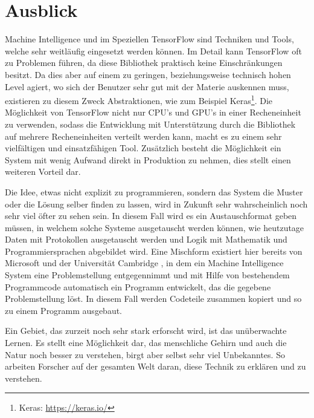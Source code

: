 \section{Ausblick}

\noindent
Machine Intelligence und im Speziellen TensorFlow sind Techniken und Tools, welche sehr weitläufig eingesetzt werden können. 
Im Detail kann TensorFlow oft zu Problemen führen, da diese Bibliothek praktisch keine Einschränkungen besitzt. 
Da dies aber auf einem zu geringen, beziehungsweise technisch hohen Level agiert, wo sich der Benutzer sehr gut mit der Materie auskennen muss, existieren zu diesem Zweck Abstraktionen, wie zum Beispiel Keras\footnote{Keras: \url{https://keras.io/}}. 
Die Möglichkeit von TensorFlow nicht nur CPU's und GPU's in einer Recheneinheit zu verwenden, sodass die Entwicklung mit Unterstützung durch die Bibliothek auf mehrere Recheneinheiten verteilt werden kann, macht es zu einem sehr vielfältigen und einsatzfähigen Tool. 
Zusätzlich besteht die Möglichkeit ein System mit wenig Aufwand direkt in Produktion zu nehmen, dies stellt einen weiteren Vorteil dar. \newline

\noindent
Die Idee, etwas nicht explizit zu programmieren, sondern das System die Muster oder die Lösung selber finden zu lassen, wird in Zukunft sehr wahrscheinlich noch sehr viel öfter zu sehen sein. 
In diesem Fall wird es ein Austauschformat geben müssen, in welchem solche Systeme ausgetauscht werden können, wie heutzutage Daten mit Protokollen ausgetauscht werden und Logik mit Mathematik und Programmiersprachen abgebildet wird. 
Eine Mischform existiert hier bereits von Microsoft und der Universität Cambridge \cite{deepcoder-learning-write-programs}, in dem ein Machine Intelligence System eine Problemstellung entgegennimmt und mit Hilfe von bestehendem Programmcode automatisch ein Programm entwickelt, das die gegebene Problemstellung löst. 
In diesem Fall werden Codeteile zusammen kopiert und so zu einem Programm ausgebaut. \newline

\noindent
Ein Gebiet, das zurzeit noch sehr stark erforscht wird, ist das unüberwachte Lernen. 
Es stellt eine Möglichkeit dar, das menschliche Gehirn und auch die Natur noch besser zu verstehen, birgt aber selbst sehr viel Unbekanntes. 
So arbeiten Forscher auf der gesamten Welt daran, diese Technik zu erklären und zu verstehen. 